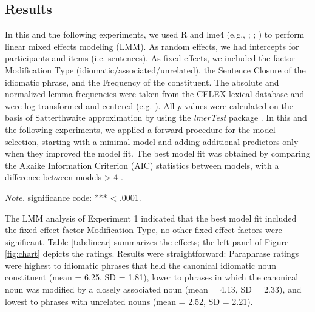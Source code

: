 \subsection{Results}

In this and the following experiments, we used R \citep{rCore:2012} and lme4 (e.g., \citealt{bates:2005}; \citealt{bates:2012}; \citealt{baayen:2008}) to perform linear mixed effects modeling (LMM). As random effects, we had intercepts for participants and items (i.e. sentences). As fixed effects, we included the factor Modification Type (idiomatic/associated/unrelated), the Sentence Closure of the idiomatic phrase, and the Frequency of the constituent. The absolute and normalized lemma frequencies were taken from the CELEX lexical database \citep{baayen:1993} and were log-transformed and centered (e.g. \citealt{winter:2013}). All \textit{p}-values were calculated on the basis of Satterthwaite approximation by using the \textit{lmerTest} package \citep{kuznetsova:2015}. In this and the following experiments, we applied a forward procedure for the model selection, starting with a minimal model and adding additional predictors only when they improved the model fit. The best model fit was obtained by comparing the Akaike Information Criterion (AIC) statistics between models, with a difference between models > 4 \citep{sakamoto:1986}. 


\begin{table}[]
\caption{\textit{Fixed Effects of the Predictors in the Linear Mixed-Effect Model for the Paraphrase Ratings in Experiment 1.}}
\label{tab:linear}
\footnotesize{\textit{Note.} significance code: *** < .0001.}
\end{table}


The LMM analysis of Experiment 1 indicated that the best model fit included the fixed-effect factor Modification Type, no other fixed-effect factors were significant.  Table \ref{tab:linear} summarizes the effects; the left panel of Figure \ref{fig:chart} depicts the ratings. Results were straightforward: Paraphrase ratings were highest to idiomatic phrases that held the canonical idiomatic noun constituent (mean = 6.25, SD = 1.81), lower to phrases in which the canonical noun was modified by a closely associated noun (mean = 4.13, SD = 2.33), and lowest to phrases with unrelated nouns (mean = 2.52, SD = 2.21).

